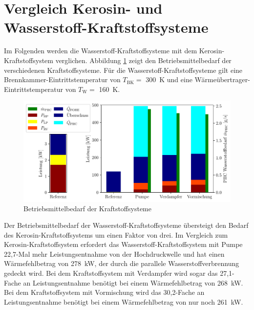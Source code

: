 \section{Vergleich Kerosin- und Wasserstoff-Kraftstoffsysteme}

Im Folgenden werden die Wasserstoff-Kraftstoffsysteme mit dem Kerosin-Kraftstoffsystem verglichen. Abbildung \ref{fig:refcomp} zeigt den Betriebsmittelbedarf der verschiedenen Kraftstoffsysteme. Für die Wasserstoff-Kraftstoffsysteme gilt eine Brennkammer-Eintrittstemperatur von $T_\mathrm{BK}=$ \SI{300}{\K} und eine Wärmeübertrager-Eintrittstemperatur von $T_\mathrm{W}=$ \SI{160}{\K}.

\begin{figure}[ht]
\centering
\includegraphics[width=1\linewidth]{4_Abbildungen/2_Hauptteil/Ergebnisse/refcomp.pdf}
  \caption{Betriebsmittelbedarf der Kraftstoffsysteme}
  \label{fig:refcomp}
\end{figure}
\FloatBarrier

Der Betriebsmittelbedarf der Wasserstoff-Kraftstoffsysteme übersteigt den Bedarf des Kerosin-Kraftstoffsystems um einen Faktor von drei. Im Vergleich zum Kerosin-Kraftstoffsystem erfordert das Wasserstoff-Kraftstoffsystem mit Pumpe 22,7-Mal mehr Leistungsentnahme von der Hochdruckwelle und hat einen Wärmefehlbetrag von \SI{278}{\kilo\W}, der durch die parallele Wasserstoffverbrennung gedeckt wird. Bei dem Kraftstoffsystem mit Verdampfer wird sogar das 27,1-Fache an Leistungsentnahme benötigt bei einem Wärmefehlbetrag von \SI{268}{\kilo\W}. Bei dem Kraftstoffsystem mit Vormischung wird das 30,2-Fache an Leistungsentnahme benötigt bei einem Wärmefehlbetrag von nur noch \SI{261}{\kilo\W}. 

